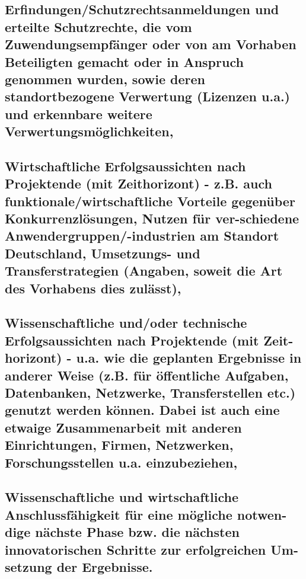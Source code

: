 \documentclass{article}
\begin{document}
\subsection{Erfindungen/Schutzrechtsanmeldungen und erteilte Schutzrechte, die vom Zuwendungsempfänger oder von am Vorhaben Beteiligten gemacht oder in Anspruch genommen wurden, sowie deren standortbezogene Verwertung (Lizenzen u.a.) und erkennbare weitere Verwertungsmöglichkeiten,}

\subsection{Wirtschaftliche Erfolgsaussichten nach Projektende (mit Zeithorizont) - z.B. auch funktionale/wirtschaftliche Vorteile gegenüber Konkurrenzlösungen, Nutzen für ver-schiedene Anwendergruppen/-industrien am Standort Deutschland, Umsetzungs- und Transferstrategien (Angaben, soweit die Art des Vorhabens dies zulässt),}

\subsection{Wissenschaftliche und/oder technische Erfolgsaussichten nach Projektende (mit Zeit-horizont) - u.a. wie die geplanten Ergebnisse in anderer Weise (z.B. für öffentliche Aufgaben, Datenbanken, Netzwerke, Transferstellen etc.) genutzt werden können. Dabei ist auch eine etwaige Zusammenarbeit mit anderen Einrichtungen, Firmen, Netzwerken, Forschungsstellen u.a. einzubeziehen,}

\subsection{Wissenschaftliche und wirtschaftliche Anschlussfähigkeit für eine mögliche notwen-dige nächste Phase bzw. die nächsten innovatorischen Schritte zur erfolgreichen Um-setzung der Ergebnisse.}
\end{document}
